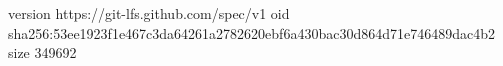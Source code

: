 version https://git-lfs.github.com/spec/v1
oid sha256:53ee1923f1e467c3da64261a2782620ebf6a430bac30d864d71e746489dac4b2
size 349692
